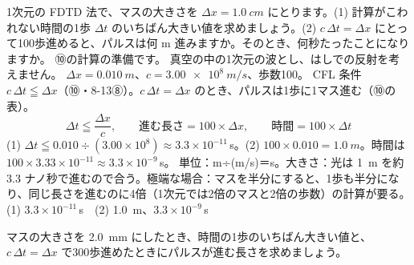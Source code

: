 \begin{phreidai}
\label{ph:電-14:ex12}1次元の FDTD 法で、マスの大きさを $\Delta x=\qty{1.0}{cm}$ にとります。(1) 計算がこわれない時間の1歩 $\Delta t$ のいちばん大きい値を求めましょう。(2) $c\,\Delta t=\Delta x$ にとって100歩進めると、パルスは何 m 進みますか。そのとき、何秒たったことになりますか。
\phbamen
⑩の計算の準備です。
\phmushi
真空の中の1次元の波とし、はしでの反射を考えません。
\phzu
$\Delta x=\qty{0.010}{m}$、$c=\qty{3.00e8}{m/s}$、歩数100。
\phriyu
CFL 条件 $c\,\Delta t\leqq\Delta x$（⑩・8-13⑧）。$c\,\Delta t=\Delta x$ のとき、パルスは1歩に1マス進む（⑩の表）。
\phtateru
\[ \Delta t\leqq\frac{\Delta x}{c},\qquad \text{進む長さ}=100\times\Delta x,\qquad \text{時間}=100\times\Delta t \]
\phtoku
(1) $\Delta t\leqq0.010\div(3.00\times10^8)\approx3.3\times10^{-11}$\,s。(2) $100\times0.010=\qty{1.0}{m}$。時間は $100\times3.33\times10^{-11}\approx3.3\times10^{-9}$\,s。
\phtashikame
単位：m÷(m/s)＝s。大きさ：光は \qty{1}{m} を約 3.3 ナノ秒で進むので合う。極端な場合：マスを半分にすると、1歩も半分になり、同じ長さを進むのに4倍（1次元では2倍のマスと2倍の歩数）の計算が要る。
\kotae (1) $3.3\times10^{-11}$\,s　(2) \qty{1.0}{m}、$3.3\times10^{-9}$\,s
\end{phreidai}
\begin{jibun}
マスの大きさを \qty{2.0}{mm} にしたとき、時間の1歩のいちばん大きい値と、$c\,\Delta t=\Delta x$ で300歩進めたときにパルスが進む長さを求めましょう。
\end{jibun}



